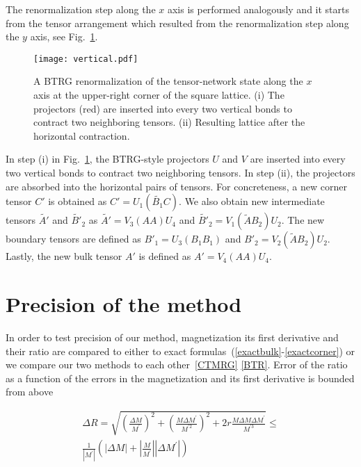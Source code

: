 \documentclass[showpacs,amssymb,twocolumn,floatfix,aps,pre,notitlepage]{revtex4-2}
\begin{document}
%
The renormalization step along the $x$ axis is performed analogously and it starts from the tensor arrangement which resulted from the renormalization step along the $y$ axis, see Fig.~\ref{fig:vertical}. 
%
\begin{figure}[htb]
\begin{center}
\texttt{[image: vertical.pdf]}
\caption{
%
A BTRG renormalization of the tensor-network state along the $x$ axis at the upper-right corner of the square lattice.
%
(i) The projectors (red) are inserted into every two vertical bonds to contract two neighboring tensors.
%
(ii) Resulting lattice after the horizontal contraction. 
%
}
\label{fig:vertical}
\end{center}
\end{figure}
%
%
In step (i) in Fig.~\ref{fig:vertical}, the BTRG-style projectors $U$ and $V$ are inserted into every two vertical bonds to contract two neighboring tensors.
%
In step (ii), the projectors are absorbed into the horizontal pairs of tensors.
%
For concreteness, a new corner tensor $C'$ is obtained as $C' = U_1 (\tilde{B_1} C)$. 
%
We also obtain new intermediate tensors $\tilde{A'}$ and $\tilde{{B'}}_2$ as $\tilde{A'} = V_3 (A A) U_4$ and $\tilde{B'}_2 = V_1 (\tilde{A} B_2) U_2$.
%
The new boundary tensors are defined as ${B'}_1 = U_3 (B_1 B_1)$ and ${B'}_2 = V_2 (\tilde{A} B_2) U_2$. 
%
Lastly, the new bulk tensor $A'$ is defined as $A' = V_4 (A A) U_4$. 
%

\section{Precision of the method}\label{precision}
In order to test precision of our method, magnetization its first derivative and their ratio are compared to either to exact formulas~(\ref{exactbulk}-\ref{exactcorner}) or we compare our two methods to each other~\ref{CTMRG} \ref{BTR}. 
Error of the ratio as a function of the errors in the magnetization and its first derivative is bounded from above

\begin{widetext}
\begin{eqnarray}
\Delta R = \sqrt{\left(\frac{\Delta M}{M^\prime}\right)^2 + \left(\frac{M\Delta M^\prime}{M^{\prime2}}\right)^2+2r\frac{M\Delta M\Delta M^\prime}{M^{\prime3}} } \le \nonumber\\
\frac1{\left| M^\prime\right|}\left(\left| \Delta M\right| + \left|\frac{M}{M^{\prime}}\right|\left|\Delta M^{\prime}\right|\right)
\end{eqnarray}
\end{widetext}
\end{document}
